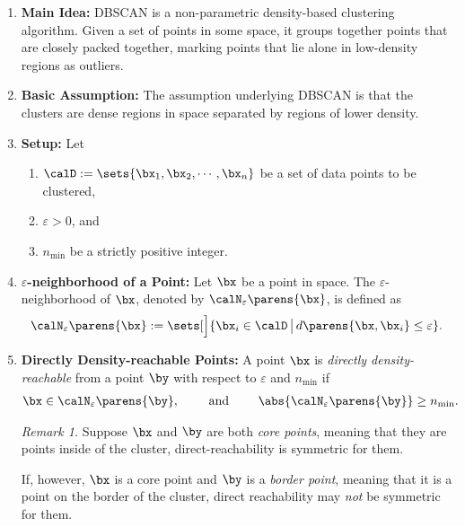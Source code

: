 \documentclass[12pt]{article}
\begin{document}
\begin{enumerate}[label=\textbf{\arabic*.}]
	
	\item \textbf{Main Idea:} DBSCAN is a non-parametric density-based clustering algorithm. Given a set of points in some space, it groups together points that are closely packed together, marking points that lie alone in low-density regions as outliers. 
	
	\item \textbf{Basic Assumption:} The assumption underlying DBSCAN is that the clusters are dense regions in space separated by regions of lower density. 
	
	\item \textbf{Setup:} Let 
	\begin{enumerate}
		\item $\calD := \sets{\bx_1, \bx_2, \cdots, \bx_n}$ be a set of data points to be clustered, 
		\item $\varepsilon > 0$, and 
		\item $n_{\min}$ be a strictly positive integer. 
	\end{enumerate}
	
	\item \textbf{$\varepsilon$-neighborhood of a Point:} Let $\bx$ be a point in space. The $\varepsilon$-neighborhood of $\bx$, denoted by $\calN_{\varepsilon} \parens{\bx}$, is defined as 
	\begin{align}
		\calN_{\varepsilon} \parens{\bx} := \sets[\Big]{ \bx_i \in \calD \,\big\vert\, d \parens{\bx, \bx_i} \le \varepsilon}. 
	\end{align}
	
	\item \textbf{Directly Density-reachable Points:} A point $\bx$ is \emph{directly density-reachable} from a point $\by$ with respect to $\varepsilon$ and $n_{\min}$ if 
	\begin{align*}
		\bx \in \calN_{\varepsilon} \parens{\by}, \qquad \text{ and } \qquad \abs{\calN_{\varepsilon} \parens{\by}} \ge n_{\min}. 
	\end{align*}
	
	\textit{Remark 1.} Suppose $\bx$ and $\by$ are both \emph{core points}, meaning that they are points inside of the cluster, direct-reachability is symmetric for them. 
	
	If, however, $\bx$ is a core point and $\by$ is a \emph{border point}, meaning that it is a point on the border of the cluster, direct reachability may \emph{not} be symmetric for them. 
		

\end{enumerate}
\end{document}
